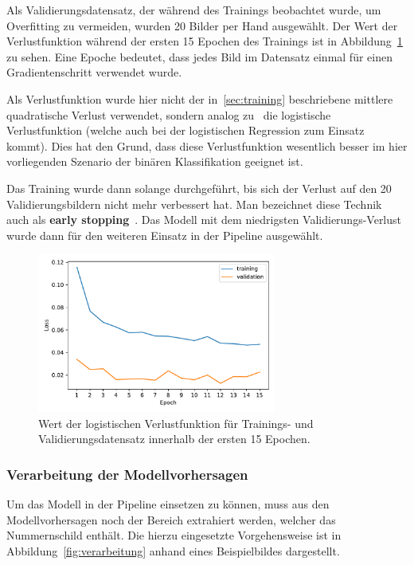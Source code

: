 Als Validierungsdatensatz, der w\"ahrend des Trainings beobachtet wurde,
um Overfitting zu vermeiden, wurden 20 Bilder per Hand ausgew\"ahlt.
Der Wert der Verlustfunktion w\"ahrend der ersten 15 Epochen des Trainings ist in
Abbildung~\ref{fig:training-loss} zu sehen.
Eine Epoche bedeutet, dass jedes Bild im Datensatz einmal f\"ur einen
Gradientenschritt verwendet wurde.

Als Verlustfunktion wurde hier nicht der in~\ref{sec:training} beschriebene
mittlere quadratische Verlust verwendet, sondern analog zu~\cite{image-segmentation}
die logistische Verlustfunktion (welche auch bei der logistischen Regression zum Einsatz kommt).
Dies hat den Grund, dass diese Verlustfunktion wesentlich besser im
hier vorliegenden Szenario der bin\"aren Klassifikation geeignet ist.

Das Training wurde dann solange durchgef\"uhrt, bis sich der Verlust auf den
20 Validierungsbildern nicht mehr verbessert hat. Man bezeichnet diese
Technik auch als \textbf{early stopping}~\cite{Goodfellow-et-al-2016}.
Das Modell mit dem niedrigsten Validierungs-Verlust wurde dann f\"ur
den weiteren Einsatz in der Pipeline ausgew\"ahlt.

\begin{figure}
    \centering
    \includegraphics[width=0.7\textwidth]{abbildungen/training_plot}
    \caption{Wert der logistischen Verlustfunktion f\"ur Trainings- und Validierungsdatensatz
        innerhalb der ersten 15 Epochen.}
    \label{fig:training-loss}
\end{figure}

\subsubsection{Verarbeitung der Modellvorhersagen}

Um das Modell in der Pipeline einsetzen zu k\"onnen, muss aus den
Modellvorhersagen noch der Bereich extrahiert werden, welcher das
Nummernschild enth\"alt. Die hierzu eingesetzte Vorgehensweise
ist in Abbildung~\ref{fig:verarbeitung} anhand eines Beispielbildes
dargestellt.

